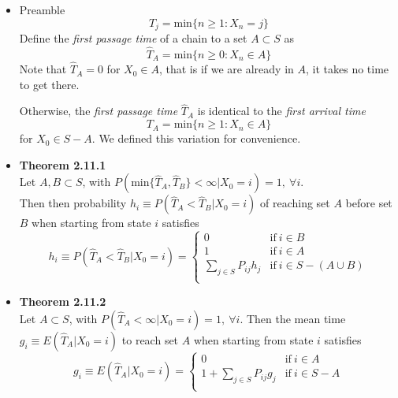 \documentclass[11pt,a4paper]{article}
\begin{document}
\begin{itemize}

    \item Preamble \\
        \[
            T_j = \text{min}\{n \geq 1 : X_n = j\}
        \]
        Define the \emph{first passage time} of a chain to a set $A \subset S$ as
        \[
            \widehat{T}_A = \text{min} \{n \geq 0 : X_n \in A \}
        \]
        Note that $\widehat{T}_A = 0$ for $X_0 \in A$,
        that is if we are already in $A$, it takes no time to get there.

        Otherwise, the \emph{first passage time} $\widehat{T}_A$ is identical to the
        \emph{first arrival time}
        \[
            T_A = \text{min} \{n \geq 1 : X_n \in A\}
        \]
        for $X_0 \in S - A$.
        We defined this variation for convenience.
    \item \textbf{Theorem 2.11.1} \\
        Let $A, B \subset S$, with
        $P(\text{min}\{\widehat{T}_A,\widehat{T}_B\} < \infty | X_0 = i) = 1, \ \forall i$. \\
        Then then probability
        $h_i \equiv P(\widehat{T}_A < \widehat{T}_B | X_0 = i)$
        of reaching set $A$ before set $B$ when starting from state $i$ satisfies
        \[
            h_i \equiv P(\widehat{T}_A < \widehat{T}_B | X_0 = i) =
            \begin{cases}{}
                0 & \text{if} \ i \in B \\
                1 & \text{if} \ i \in A \\
                \sum_{j \in S} P_{ij}h_j & \text{if} \ i \in S - (A \cup B) \\
            \end{cases}
        \]
    \item \textbf{Theorem 2.11.2} \\
        Let $A \subset S$, with $P(\widehat{T}_A < \infty | X_0 = i) = 1, \ \forall i$.
        Then the mean time $g_i \equiv E(\widehat{T}_A | X_0 = i)$
        to reach set $A$ when starting from state $i$ satisfies
        \[
            g_i \equiv E(\widehat{T}_A | X_0 = i) =
            \begin{cases}{}
                0 & \text{if} \ i \in A \\
                1 + \sum_{j \in S} P_{ij}g_j & \text{if} \ i \in S - A \\
            \end{cases}
        \]
\end{itemize}
\end{document}
